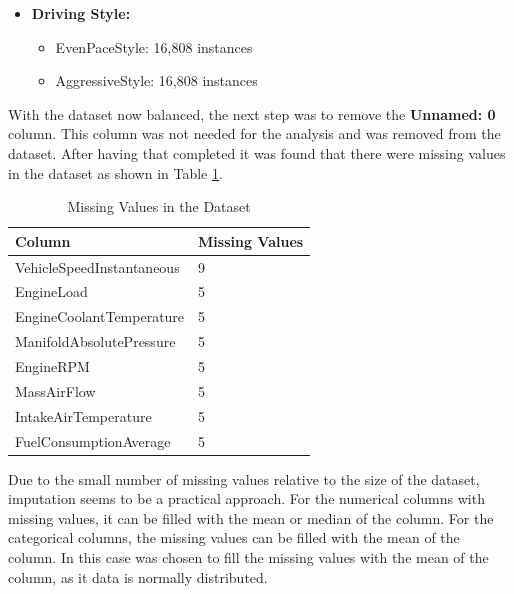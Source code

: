 \documentclass[10pt,journal,compsoc]{IEEEtran}
\begin{document}
\begin{itemize}
    \item \textbf{Driving Style:}
    \begin{itemize}
        \item EvenPaceStyle: 16,808 instances
        \item AggressiveStyle: 16,808 instances
    \end{itemize}
\end{itemize}

With the dataset now balanced, the next step was to remove the \textbf{Unnamed: 0} column. This column was not needed for the analysis and was removed from the dataset.
After having that completed it was found that there were missing values in the dataset as shown in Table \ref{table:data_missing_values}.

\begin{table}[h]
    \centering    
    \begin{tabular}{|l|l|}
    \hline
    \textbf{Column}                   & \textbf{Missing Values} \\ \hline
    VehicleSpeedInstantaneous         & 9                       \\ \hline
    EngineLoad                        & 5                       \\ \hline
    EngineCoolantTemperature          & 5                       \\ \hline
    ManifoldAbsolutePressure          & 5                       \\ \hline
    EngineRPM                         & 5                       \\ \hline
    MassAirFlow                       & 5                       \\ \hline
    IntakeAirTemperature              & 5                       \\ \hline
    FuelConsumptionAverage            & 5                       \\ \hline
    \end{tabular}
    \caption{Missing Values in the Dataset}
    \label{table:data_missing_values}
\end{table}

Due to the small number of missing values relative to the size of the dataset, imputation seems to be a practical approach. For the numerical columns with missing values, it can be filled
with the mean or median of the column. For the categorical columns, the missing values can be filled with the mean of the column.
In this case was chosen to fill the missing values with the mean of the column, as it data is normally distributed.
\end{document}
